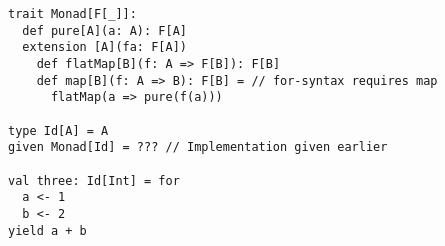 \begin{algorithm}
\begin{verbatim}
trait Monad[F[_]]:
  def pure[A](a: A): F[A]
  extension [A](fa: F[A])
    def flatMap[B](f: A => F[B]): F[B]
    def map[B](f: A => B): F[B] = // for-syntax requires map
      flatMap(a => pure(f(a)))

type Id[A] = A
given Monad[Id] = ??? // Implementation given earlier

val three: Id[Int] = for
  a <- 1
  b <- 2
yield a + b
\end{verbatim}

\caption{For-syntax enabled by extension methods %
\label{scala:for-comprehension}}
\end{algorithm}

